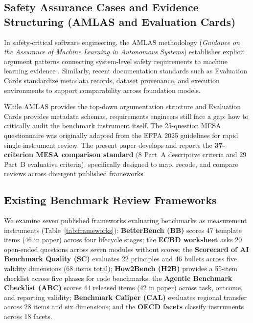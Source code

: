 \documentclass[runningheads]{llncs}
\begin{document}
\subsection{Safety Assurance Cases and Evidence Structuring (AMLAS and Evaluation Cards)}
In safety-critical software engineering, the AMLAS methodology (\emph{Guidance on the Assurance of Machine Learning in Autonomous Systems}) establishes explicit argument patterns connecting system-level safety requirements to machine learning evidence \cite{hawkins_amlas_2021}. Similarly, recent documentation standards such as Evaluation Cards \cite{ghosh_evaluation_cards_2026} standardize metadata records, dataset provenance, and execution environments to support comparability across foundation models.

While AMLAS provides the top-down argumentation structure and Evaluation Cards provides metadata schemas, requirements engineers still face a gap: how to critically audit the benchmark instrument itself. The 25-question MESA questionnaire was originally adapted from the EFPA 2025 guidelines for rapid single-instrument review. The present paper develops and reports the \textbf{37-criterion MESA comparison standard} (8 Part~A descriptive criteria and 29 Part~B evaluative criteria), specifically designed to map, recode, and compare reviews across divergent published frameworks.

\subsection{Existing Benchmark Review Frameworks}
We examine seven published frameworks evaluating benchmarks as measurement instruments (Table~\ref{tab:frameworks}): \textbf{BetterBench (BB)} \cite{reuel_betterbench} scores 47 template items (46 in paper) across four lifecycle stages; the \textbf{ECBD worksheet} \cite{liu_ecbd_2024} asks 20 open-ended questions across seven modules without scores; the \textbf{Scorecard of AI Benchmark Quality (SC)} \cite{san_joaquin_scorecard_2026} evaluates 22 principles and 46 bullets across five validity dimensions (68 items total); \textbf{How2Bench (H2B)} \cite{cao_how2bench_2025} provides a 55-item checklist across five phases for code benchmarks; the \textbf{Agentic Benchmark Checklist (ABC)} \cite{zhu_agentic_benchmark_checklist_2025} scores 44 released items (42 in paper) across task, outcome, and reporting validity; \textbf{Benchmark Caliper (CAL)} \cite{corona_benchmark_caliper_2026} evaluates regional transfer across 28 items and six dimensions; and the \textbf{OECD facets} \cite{cohn_hernandez_orallo_oecd_2023} classify instruments across 18 facets.
\end{document}
